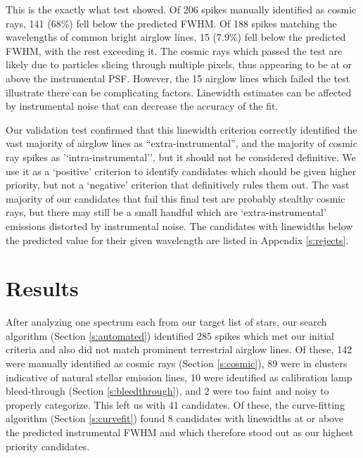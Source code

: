 \documentclass[linenumbers]{aastex631}
\begin{document}
This is the exactly what test showed.  Of 206 spikes manually identified as cosmic rays, 141 (68\%) fell below the predicted FWHM.  Of 188 spikes matching the wavelengths of common bright airglow lines, 15 (7.9\%) fell below the predicted FWHM, with the rest exceeding it. The cosmic rays which passed the test are likely due to particles slicing through multiple pixels, thus appearing to be at or above the instrumental PSF. However, the 15 airglow lines which failed the test illustrate there can be complicating factors. Linewidth estimates can be affected by instrumental noise that can decrease the accuracy of the fit. 

Our validation test confirmed that this linewidth criterion correctly identified the vast majority of airglow lines as ``extra-instrumental'', and the majority of cosmic ray spikes as '`intra-instrumental'', but it should not be considered definitive.  We use it as a `positive' criterion to identify candidates which should be given higher priority, but not a `negative' criterion that definitively rules them out.  The vast majority of our candidates that fail this final test are probably stealthy cosmic rays, but there may still be a small handful which are `extra-instrumental' emissions distorted by instrumental noise. The candidates with linewidths below the predicted value for their given wavelength are listed in Appendix \ref{s:rejects}.

\section{Results}
\label{s:results}
After analyzing one spectrum each from our target list of stars, our search algorithm (Section \ref{s:automated}) identified 285 spikes which met our initial criteria and also did not match prominent terrestrial airglow lines. Of these, 142 were manually identified as cosmic rays (Section \ref{s:cosmic}), 89 were in clusters indicative of natural stellar emission lines,  10 were identified as calibration lamp bleed-through (Section \ref{s:bleedthrough}), and 2 were too faint and noisy to properly categorize. This left us with 41 candidates. Of these, the curve-fitting algorithm (Section \ref{s:curvefit}) found 8 candidates with linewidths at or above the predicted instrumental FWHM and which therefore stood out as our highest priority candidates. 
\end{document}
